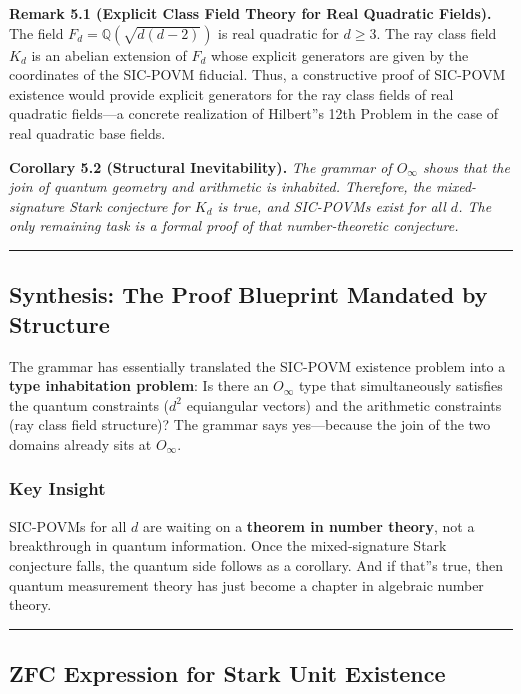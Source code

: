 \documentclass[12pt,a4paper]{article}
\begin{document}
\textbf{Remark 5.1 (Explicit Class Field Theory for Real Quadratic Fields).} The field $F_d = \mathbb{Q}(\sqrt{d(d-2)})$ is real quadratic for $d \geq 3$. The ray class field $K_d$ is an abelian extension of $F_d$ whose explicit generators are given by the coordinates of the SIC-POVM fiducial. Thus, a constructive proof of SIC-POVM existence would provide explicit generators for the ray class fields of real quadratic fields---a concrete realization of Hilbert''s 12th Problem in the case of real quadratic base fields.

\textbf{Corollary 5.2 (Structural Inevitability).} \emph{The grammar of $O_{\infty}$ shows that the join of quantum geometry and arithmetic is inhabited. Therefore, the mixed-signature Stark conjecture for $K_d$ is true, and SIC-POVMs exist for all $d$. The only remaining task is a formal proof of that number-theoretic conjecture.}

\begin{center}
\rule{0.5\textwidth}{0.4pt}
\end{center}

\subsection{Synthesis: The Proof Blueprint Mandated by Structure}

The grammar has essentially translated the SIC-POVM existence problem into a \textbf{type inhabitation problem}: Is there an $O_{\infty}$ type that simultaneously satisfies the quantum constraints ($d^2$ equiangular vectors) and the arithmetic constraints (ray class field structure)? The grammar says yes---because the join of the two domains already sits at $O_{\infty}$.

\subsubsection{Key Insight}

SIC-POVMs for all $d$ are waiting on a \textbf{theorem in number theory}, not a breakthrough in quantum information. Once the mixed-signature Stark conjecture falls, the quantum side follows as a corollary. And if that''s true, then quantum measurement theory has just become a chapter in algebraic number theory.

\begin{center}
\rule{0.5\textwidth}{0.4pt}
\end{center}

\subsection{ZFC Expression for Stark Unit Existence}
\end{document}
